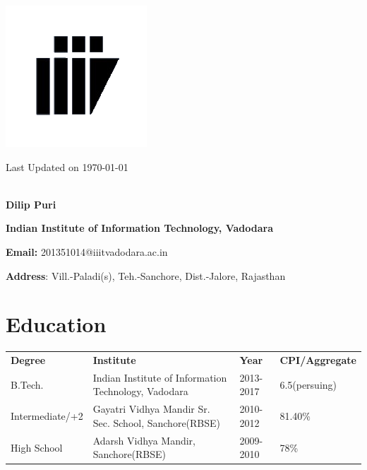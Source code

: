 \documentclass{article}
\begin{document}
\begin{minipage}{.1\textwidth}
\includegraphics[scale=0.6]{logo_iiitv.png}
\end{minipage}%
\begin{minipage}{1.5\textwidth}
\hspace*{12cm}Last Updated on \today \\ \\
\begin{large}
\hspace*{4cm}\textbf{Dilip Puri}\vspace*{2mm}

\hspace*{4cm}\textbf{Indian Institute of Information Technology, Vadodara}\vspace*{2mm}

\hspace*{4cm}\textbf{Email:} 201351014@iiitvadodara.ac.in\vspace*{2mm}

\hspace*{4cm}\textbf{Address}: Vill.-Paladi(s), Teh.-Sanchore, Dist.-Jalore, Rajasthan
\end{large}    
\end{minipage}

\section{Education}
\begin{tabular}{llll}
\textbf{Degree}&\textbf{Institute}&\textbf{Year}&\textbf{CPI/Aggregate}\vspace*{1mm} \\
B.Tech.& Indian Institute of Information Technology, Vadodara & 2013-2017 & 6.5(persuing)\\
Intermediate/+2 & Gayatri Vidhya Mandir Sr. Sec. School, Sanchore(RBSE) & 2010-2012 & 81.40\%\\
High School & Adarsh Vidhya Mandir, Sanchore(RBSE) & 2009-2010 & 78\%\\
\end{tabular}
\end{document}
